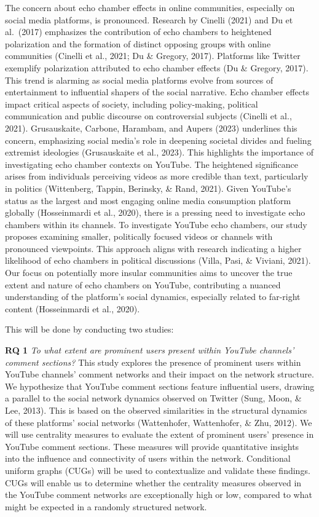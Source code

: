 \documentclass[
  man,floatsintext]{apa6}
\begin{document}
The concern about echo chamber effects in online communities, especially on social media platforms, is pronounced. Research by Cinelli (2021) and Du et al.~(2017) emphasizes the contribution of echo chambers to heightened polarization and the formation of distinct opposing groups with online communities (Cinelli et al., 2021; Du \& Gregory, 2017). Platforms like Twitter exemplify polarization attributed to echo chamber effects (Du \& Gregory, 2017). This trend is alarming as social media platforms evolve from sources of entertainment to influential shapers of the social narrative. Echo chamber effects impact critical aspects of society, including policy-making, political communication and public discourse on controversial subjects (Cinelli et al., 2021). Grusauskaite, Carbone, Harambam, and Aupers (2023) underlines this concern, emphasizing social media's role in deepening societal divides and fueling extremist ideologies (Grusauskaite et al., 2023). This highlights the importance of investigating echo chamber contexts on YouTube. The heightened significance arises from individuals perceiving videos as more credible than text, particularly in politics (Wittenberg, Tappin, Berinsky, \& Rand, 2021). Given YouTube's status as the largest and most engaging online media consumption platform globally (Hosseinmardi et al., 2020), there is a pressing need to investigate echo chambers within its channels.
To investigate YouTube echo chambers, our study proposes examining smaller, politically focused videos or channels with pronounced viewpoints. This approach aligns with research indicating a higher likelihood of echo chambers in political discussions (Villa, Pasi, \& Viviani, 2021). Our focus on potentially more insular communities aims to uncover the true extent and nature of echo chambers on YouTube, contributing a nuanced understanding of the platform's social dynamics, especially related to far-right content (Hosseinmardi et al., 2020).

This will be done by conducting two studies:

\textbf{RQ 1 } \emph{To what extent are prominent users present within YouTube channels' comment sections?}
This study explores the presence of prominent users within YouTube channels' comment networks and their impact on the network structure. We hypothesize that YouTube comment sections feature influential users, drawing a parallel to the social network dynamics observed on Twitter (Sung, Moon, \& Lee, 2013). This is based on the observed similarities in the structural dynamics of these platforms' social networks (Wattenhofer, Wattenhofer, \& Zhu, 2012). We will use centrality measures to evaluate the extent of prominent users' presence in YouTube comment sections. These measures will provide quantitative insights into the influence and connectivity of users within the network. Conditional uniform graphs (CUGs) will be used to contextualize and validate these findings. CUGs will enable us to determine whether the centrality measures observed in the YouTube comment networks are exceptionally high or low, compared to what might be expected in a randomly structured network.
\end{document}
